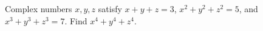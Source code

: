 Complex numbers $x,y,z$ satisfy $x+y+z=3$, $x^2+y^2+z^2=5$, and $x^3+y^3+z^3=7$. Find $x^4+y^4+z^4$.
